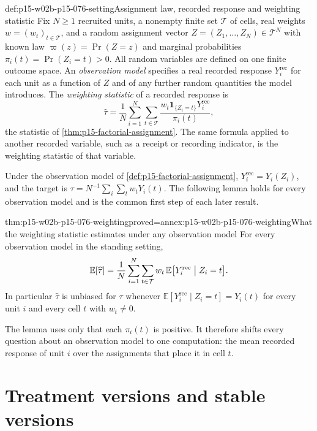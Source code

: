 \begin{hbconvention}{def:p15-w02b-p15-076-setting}{Assignment law, recorded response and weighting statistic}
Fix \(N\geq1\) recruited units, a nonempty finite set \(\mathcal T\) of
cells, real weights \(w=(w_t)_{t\in\mathcal T}\), and a random assignment
vector \(Z=(Z_1,\ldots,Z_N)\in\mathcal T^N\) with known law
\(\varpi(z)=\Pr(Z=z)\) and marginal probabilities
\(\pi_i(t)=\Pr(Z_i=t)>0\). All random variables are defined on one finite
outcome space. An \emph{observation model} specifies a real recorded
response \(Y_i^{\mathrm{rec}}\) for each unit as a function of \(Z\) and of
any further random quantities the model introduces. The \emph{weighting
statistic} of a recorded response is
\[
 \widehat\tau=\frac1N\sum_{i=1}^N\sum_{t\in\mathcal T}
   \frac{w_t\mathbf 1_{\{Z_i=t\}}Y_i^{\mathrm{rec}}}{\pi_i(t)},
\]
the statistic of \cref{thm:p15-factorial-assignment}. The same formula
applied to another recorded variable, such as a receipt or recording
indicator, is the weighting statistic of that variable.
\end{hbconvention}

Under the observation model of \cref{def:p15-factorial-assignment},
\(Y_i^{\mathrm{rec}}=Y_i(Z_i)\), and the target is
\(\tau=N^{-1}\sum_i\sum_tw_tY_i(t)\). The following lemma holds for every
observation model and is the common first step of each later result.

\begin{hblemma}{thm:p15-w02b-p15-076-weighting}{proved=annex:p15-w02b-p15-076-weighting}{What the weighting statistic estimates under any observation model}
For every observation model in the standing setting,
\[
 \mathbb E[\widehat\tau]=\frac1N\sum_{i=1}^N\sum_{t\in\mathcal T}
   w_t\,\mathbb E\bigl[Y_i^{\mathrm{rec}}\bigm| Z_i=t\bigr].
\]
In particular \(\widehat\tau\) is unbiased for \(\tau\) whenever
\(\mathbb E[Y_i^{\mathrm{rec}}\mid Z_i=t]=Y_i(t)\) for every unit \(i\)
and every cell \(t\) with \(w_t\ne0\).
\end{hblemma}

The lemma uses only that each \(\pi_i(t)\) is positive. It therefore
shifts every question about an observation model to one computation: the
mean recorded response of unit \(i\) over the assignments that place it in
cell \(t\).

\section{Treatment versions and stable versions}
\label{sec:p15-w02b-p15-076-versions}

